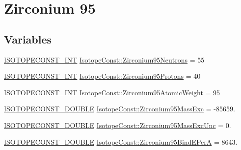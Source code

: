\hypertarget{group___isotope_const-_zirconium-_zr95}{}\section{Zirconium 95}
\label{group___isotope_const-_zirconium-_zr95}
\subsection*{Variables}
\begin{DoxyCompactItemize}
\item 
\mbox{\hyperlink{group___isotope_const-_macros_ga5f18360b3e99483a35c32d789e62621c}{I\+S\+O\+T\+O\+P\+E\+C\+O\+N\+S\+T\+\_\+\+I\+NT}} \mbox{\hyperlink{group___isotope_const-_zirconium-_zr95_ga02b1a8af878b6cfdb295370ebbd353d6}{Isotope\+Const\+::\+Zirconium95\+Neutrons}} = 55
\item 
\mbox{\hyperlink{group___isotope_const-_macros_ga5f18360b3e99483a35c32d789e62621c}{I\+S\+O\+T\+O\+P\+E\+C\+O\+N\+S\+T\+\_\+\+I\+NT}} \mbox{\hyperlink{group___isotope_const-_zirconium-_zr95_gade9d7292fd409335bc579b568ede81f7}{Isotope\+Const\+::\+Zirconium95\+Protons}} = 40
\item 
\mbox{\hyperlink{group___isotope_const-_macros_ga5f18360b3e99483a35c32d789e62621c}{I\+S\+O\+T\+O\+P\+E\+C\+O\+N\+S\+T\+\_\+\+I\+NT}} \mbox{\hyperlink{group___isotope_const-_zirconium-_zr95_ga961a212eb75464a8f84d573fee3a4113}{Isotope\+Const\+::\+Zirconium95\+Atomic\+Weight}} = 95
\item 
\mbox{\hyperlink{group___isotope_const-_macros_ga8f45a7272ce02c0b4c65c44636ed719a}{I\+S\+O\+T\+O\+P\+E\+C\+O\+N\+S\+T\+\_\+\+D\+O\+U\+B\+LE}} \mbox{\hyperlink{group___isotope_const-_zirconium-_zr95_gaa39d8f615ffdf6c7367bb81760afbb87}{Isotope\+Const\+::\+Zirconium95\+Mass\+Exc}} = -\/85659.
\item 
\mbox{\hyperlink{group___isotope_const-_macros_ga8f45a7272ce02c0b4c65c44636ed719a}{I\+S\+O\+T\+O\+P\+E\+C\+O\+N\+S\+T\+\_\+\+D\+O\+U\+B\+LE}} \mbox{\hyperlink{group___isotope_const-_zirconium-_zr95_ga5068da7a4a35f8e9c4a8ce527f07ff01}{Isotope\+Const\+::\+Zirconium95\+Mass\+Exc\+Unc}} = 0.
\item 
\mbox{\hyperlink{group___isotope_const-_macros_ga8f45a7272ce02c0b4c65c44636ed719a}{I\+S\+O\+T\+O\+P\+E\+C\+O\+N\+S\+T\+\_\+\+D\+O\+U\+B\+LE}} \mbox{\hyperlink{group___isotope_const-_zirconium-_zr95_gac2803ba39ee4e1e176990f658ce11f6c}{Isotope\+Const\+::\+Zirconium95\+Bind\+E\+PerA}} = 8643.
\item 

\end{DoxyCompactItemize}
